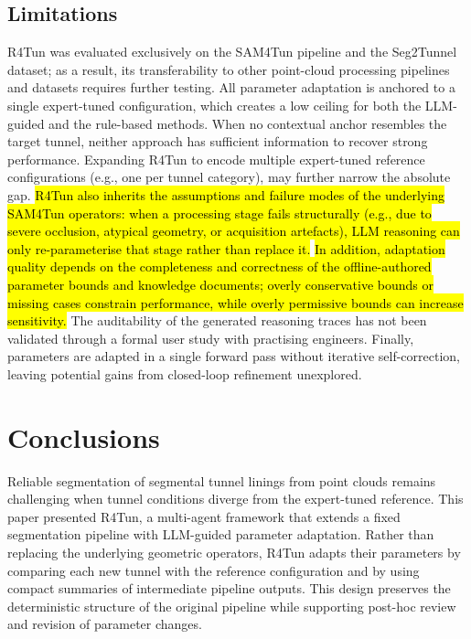 \documentclass[a4paper,fleqn]{cas-dc}
\begin{document}
{\subsection{Limitations}\label{sec:limitations}

R4Tun was evaluated exclusively on the SAM4Tun pipeline and the Seg2Tunnel dataset; as a result, its transferability to other point-cloud processing pipelines and datasets requires further testing. All parameter adaptation is anchored to a single expert-tuned configuration, which creates a low ceiling for both the LLM-guided and the rule-based methods. When no contextual anchor resembles the target tunnel, neither approach has sufficient information to recover strong performance. Expanding R4Tun to encode multiple expert-tuned reference configurations (e.g., one per tunnel category), may further narrow the absolute gap. \hl{R4Tun also inherits the assumptions and failure modes of the underlying SAM4Tun operators: when a processing stage fails structurally (e.g., due to severe occlusion, atypical geometry, or acquisition artefacts), LLM reasoning can only re-parameterise that stage rather than replace it.} \hl{In addition, adaptation quality depends on the completeness and correctness of the offline-authored parameter bounds and knowledge documents; overly conservative bounds or missing cases constrain performance, while overly permissive bounds can increase sensitivity.} The auditability of the generated reasoning traces has not been validated through a formal user study with practising engineers. Finally, parameters are adapted in a single forward pass without iterative self-correction, leaving potential gains from closed-loop refinement unexplored.

\section{Conclusions}\label{sec:conclusions}

Reliable segmentation of segmental tunnel linings from point clouds remains challenging when tunnel conditions diverge from the expert-tuned reference. This paper presented R4Tun, a multi-agent framework that extends a fixed segmentation pipeline with LLM-guided parameter adaptation. Rather than replacing the underlying geometric operators, R4Tun adapts their parameters by comparing each new tunnel with the reference configuration and by using compact summaries of intermediate pipeline outputs. This design preserves the deterministic structure of the original pipeline while supporting post-hoc review and revision of parameter changes.

}
\end{document}

